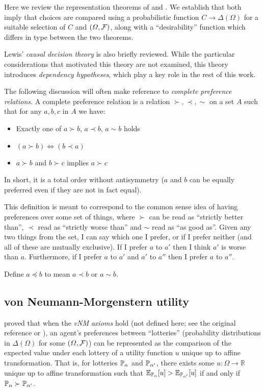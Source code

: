 Here we review the representation theorems of \citet{savage_foundations_1954} and \citet{jeffrey_logic_1990}. We establish that both imply that choices are compared using a probabilistic function $C\to \Delta(\Omega)$ for a suitable selection of $C$ and $(\Omega,\mathcal{F})$, along with a ``desirability'' function which differs in type between the two theorems.

Lewis' \emph{causal decision theory} is also briefly reviewed. While the particular considerations that motivated this theory are not examined, this theory introduces \emph{dependency hypotheses}, which play a key role in the rest of this work.

The following discussion will often make reference to \emph{complete preference relations}. A complete preference relation is a relation $\succ,\prec,\sim$ on a set $A$ such that for any $a,b,c$ in $A$ we have:
\begin{itemize}
    \item Exactly one of $a\succ b$, $a\prec b$, $a\sim b$ holds
    \item $(a\succ b)\iff(b\prec a)$
    \item $a\succ b$ and $b\succ c$ implies $a\succ c$
\end{itemize}
In short, it is a total order without antisymmetry ($a$ and $b$ can be equally preferred even if they are not in fact equal).

This definition is meant to correspond to the common sense idea of having preferences over some set of things, where $\succ$ can be read as ``strictly better than'', $\prec$ read as ``strictly worse than'' and $\sim$ read as ``as good as''. Given any two things from the set, I can say which one I prefer, or if I prefer neither (and all of these are mutually exclusive). If I prefer $a$ to $a'$ then I think $a'$ is worse than $a$. Furthermore, if I prefer $a$ to $a'$ and $a'$ to $a''$ then I prefer $a$ to $a''$.

Define $a\preceq b$ to mean $a\prec b$ or $a \sim b$.

\subsection{von Neumann-Morgenstern utility}

\citet{von_neumann_theory_1944} proved that when the \emph{vNM axioms} hold (not defined here; see the original reference or \citet{steele_decision_2020}), an agent's preferences between ``lotteries'' (probability distributions in $\Delta(\Omega)$ for some $(\Omega,\mathcal{F})$) can be represented as the comparison of the expected value under each lottery of a utility function $u$ unique up to affine transformation. That is, for lotteries $\mathbb{P}_\alpha$ and $\mathbb{P}_{\alpha'}$, there exists some $u:\Omega\to \mathbb{R}$ unique up to affine transformation such that $\mathbb{E}_{\mathbb{P}_\alpha}[u]> \mathbb{E}_{\mathbb{P}_{\alpha'}}[u]$ if and only if $\mathbb{P}_{\alpha} \succ \mathbb{P}_{\alpha'}$.

